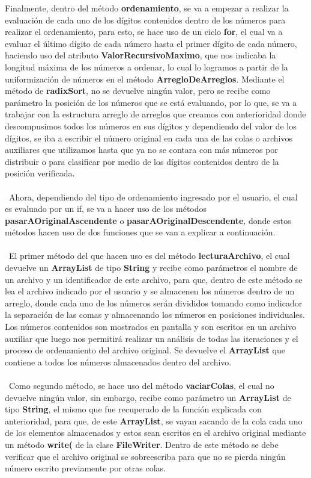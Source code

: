 \documentclass[12pt,letterpaper]{report}
\begin{document}
Finalmente, dentro del método \textbf{ordenamiento}, se va a empezar a realizar la evaluación de cada uno de los dígitos contenidos dentro de los números para realizar el ordenamiento, para esto, se hace uso de un ciclo \textbf{for}, el cual va a evaluar el último dígito de cada número hasta el primer dígito de cada número, haciendo uso del atributo \textbf{ValorRecursivoMaximo}, que nos indicaba la longitud máxima de los números a ordenar, lo cual lo logramos a partir de la uniformización de números en el método \textbf{ArregloDeArreglos}. Mediante el método de \textbf{radixSort}, no se devuelve ningún valor, pero se recibe como parámetro la posición de los números que se está evaluando, por lo que, se va a trabajar con la estructura arreglo de arreglos que creamos con anterioridad donde descompusimos todos los números en sus dígitos y dependiendo del valor de los dígitos, se iba a escribir el número original en cada una de las colas o archivos auxiliares que utilizamos hasta que ya no se contara con más números por distribuir o para clasificar por medio de los dígitos contenidos dentro de la posición verificada.\\\\\
Ahora, dependiendo del tipo de ordenamiento ingresado por el usuario, el cual es evaluado por un if, se va a hacer uso de los métodos \textbf{pasarAOriginalAscendente} o \textbf{pasarAOriginalDescendente}, donde estos métodos hacen uso de dos funciones que se van a explicar a continuación.\\\\\
El primer método del que hacen uso es del método \textbf{lecturaArchivo}, el cual devuelve un \textbf{ArrayList} de tipo \textbf{String} y recibe como parámetros el nombre de un archivo y un identificador de este archivo, para que, dentro de este método se lea el archivo indicado por el usuario y se almacenen los números dentro de un arreglo, donde cada uno de los números serán divididos tomando como indicador la separación de las comas y almacenando los números en posiciones individuales. Los números contenidos son mostrados en pantalla y son escritos en un archivo auxiliar que luego nos permitirá realizar un análisis de todas las iteraciones y el proceso de ordenamiento del archivo original. Se devuelve el \textbf{ArrayList} que contiene a todos los números almacenados dentro del archivo.\\\\\
Como segundo método, se hace uso del método \textbf{vaciarColas}, el cual no devuelve ningún valor, sin embargo, recibe como parámetro un \textbf{ArrayList} de tipo \textbf{String}, el mismo que fue recuperado de la función explicada con anterioridad, para que, de este \textbf{ArrayList}, se vayan sacando de la cola cada uno de los elementos almacenados y estos sean escritos en el archivo original mediante un método \textbf{write(} de la clase \textbf{FileWriter}. Dentro de este método se debe verificar que el archivo original se sobreescriba para que no se pierda ningún número escrito previamente por otras colas.\\\\\
\end{document}
